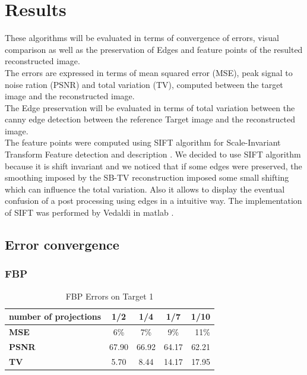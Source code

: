 \section{Results}

These algorithms will be evaluated in terms of convergence of errors, visual comparison as well as the preservation of Edges and feature points of the resulted reconstructed image.\\
The errors are expressed in terms of mean squared error (MSE), peak signal to noise ration (PSNR) and total variation (TV), computed between the target image and the reconstructed image.\\
The Edge preservation will be evaluated in terms of total variation between the canny edge detection between the reference Target image and the reconstructed image.\\
The feature points were computed using SIFT algorithm for Scale-Invariant Transform Feature detection and description \cite{lowe04distinctive}. We decided to use SIFT algorithm because it is shift invariant and we noticed that if some edges were preserved, the smoothing imposed by the SB-TV reconstruction imposed some small shifting which can influence the total variation. Also it allows to display the eventual confusion of a post processing using edges in a intuitive way. The implementation of SIFT was performed by Vedaldi in matlab \cite{vedaldi2007open}.

\subsection{Error convergence}
\subsubsection{FBP}
	\begin{table}[ht!]
		\center
		\begin{tabular}{ | l || c | c | c | r | }
 			\hline			
   			\textbf{number of projections}	& \textbf{1/2}	& \textbf{1/4}	& \textbf{1/7}	& \textbf{1/10} \\
   			\hline
   			\hline
			\textbf{MSE}					& 6\%	& 7\%	& 9\%	& 11\% \\
			\hline  
			\textbf{PSNR}					& 67.90 & 66.92 & 64.17 & 62.21	\\
			\hline 
			\textbf{TV}						& 5.70  & 8.44  & 14.17 & 17.95 \\
			\hline
		\end{tabular}
		\caption{FBP Errors on Target 1}
		\label{tab:FBPErrorsTarget1}
		
	\end{table}

